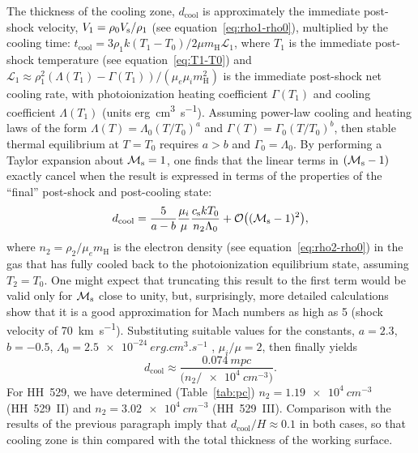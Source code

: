 \documentclass[useAMS, usenatbib]{mnras}
\begin{document}
The thickness of the cooling zone, \(d_{\text{cool}}\) is approximately the immediate post-shock velocity, \(V_1 = \rho_0 V_{\text{s}} / \rho_1\) (see equation~\eqref{eq:rho1-rho0}),
multiplied by the cooling time:
\(t_{\text{cool}}  = 3 \rho_1 k (T_1 - T_0) / 2 \mu m_{\mathrm{H}} \mathcal{L}_1\),
where \(T_1\) is the immediate post-shock temperature
(see equation~\eqref{eq:T1-T0})
and \(\mathcal{L}_1 \approx \rho_1^2 (\Lambda(T_1) - \Gamma(T_1)) / (\mu_e \mu_i m_{\mathrm{H}}^2)\) is the immediate post-shock net cooling rate, with photoionization heating coefficient \(\Gamma(T_1)\)
and cooling coefficient \(\Lambda(T_1)\) (units \si{erg.cm^3.s^{-1}}).
Assuming power-law cooling and heating laws of the form
\(\Lambda(T) = \Lambda_0 (T/T_0)^a\) and \(\Gamma(T) = \Gamma_0 (T/T_0)^b\),
then stable thermal equilibrium at \(T = T_0\) requires
\(a > b\) and \(\Gamma_0 = \Lambda_0\).
By performing a Taylor expansion about \(\mathcal{M}_{\text{s}} = 1\),
one finds that the linear terms in \((\mathcal{M}_{\text{s}} - 1)\) exactly cancel
when the result is expressed in terms of the properties of the ``final'' post-shock and post-cooling state:
\begin{equation}
  \label{eq:dcool}
  d_{\text{cool}} = \frac{5}{a-b} \frac{\mu_i}{\mu} \frac{c_{\mathrm{s}} k T_0}{n_2 \Lambda_0}
  + \mathcal{O}\bigl((\mathcal{M}_{\text{s}} - 1)^2\bigr), 
\end{equation}
where \(n_2 = \rho_2 / \mu_e m_{\text{H}}\) is the electron density
(see equation~\eqref{eq:rho2-rho0})
in the gas that has fully cooled back to the photoionization equilibrium state, assuming \(T_2 = T_0\).
One might expect that truncating this result to the first term 
would be valid only for \(\mathcal{M}_{\text{s}}\) close to unity,
but, surprisingly, more detailed calculations show that it is
a good approximation for Mach numbers as high as 5 (shock velocity of \SI{70}{km.s^{-1}}).
Substituting suitable values for the constants,
\(a = 2.3\), \(b = -0.5\), \(\Lambda_0 = \SI{2.5e-24}{erg.cm^3.s^{-1}}\)
\citep{Osterbrock:2006a},
\(\mu_i/\mu = 2\), then finally yields
\begin{equation}
  \label{eq:dcool-final}
  d_{\text{cool}} \approx \frac{\SI{0.074}{mpc}}
  {\bigl(  n_2 / \SI{e4}{cm^{-3}}\bigr)} .
\end{equation}
For HH~529, we have determined (Table~\ref{tab:pc})
\(n_2 = \SI{1.19e4}{cm^{-3}}\) (HH~529~II)
and \(n_2 = \SI{3.02e4}{cm^{-3}}\) (HH~529~III).
Comparison with the results of the previous paragraph
imply that \(d_{\text{cool}} / H \approx 0.1\) in both cases,
so that cooling zone is thin compared with the total thickness of the working surface.
\end{document}

